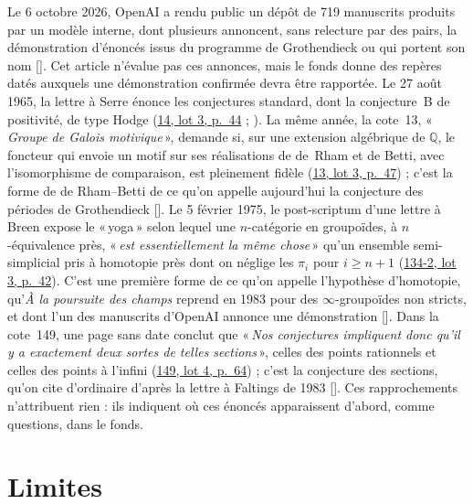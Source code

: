 \documentclass[11pt]{amsart}
\makeatletter
\newcommand{\q}[1]{«\,\textit{#1}\,»}
\newcommand{\mot}[1]{«\,#1\,»}
\def\RHM@first#1--#2\@nil{#1}
\DeclareRobustCommand{\lot}[3]{\begingroup\edef\RHM@pdfpage{\the\numexpr\RHM@first#3--\@nil+1\relax}\href{https://grothendieck.umontpellier.fr/#1.pdf\#page=\RHM@pdfpage}{#1, lot #2, p.~#3}\endgroup}
\newcommand{\lot}[3]{\href{https://grothendieck.commutator.io/\##1/#2/p#3}{#1, lot #2, p.~#3}}
\makeatother
\begin{document}
Le 6 octobre 2026, OpenAI a rendu public un dépôt de 719 manuscrits produits par un modèle interne, dont plusieurs annoncent, sans relecture par des pairs, la démonstration d'énoncés issus du programme de Grothendieck ou qui portent son nom [\citealp{openai2026}]. Cet article n'évalue pas ces annonces, mais le fonds donne des repères datés auxquels une démonstration confirmée devra être rapportée. Le 27 août 1965, la lettre à Serre énonce les conjectures standard, dont la conjecture~B de positivité, de type Hodge (\lot{14}{3}{44} ; \citealp{colmez2001}). La même année, la cote~13, \q{Groupe de Galois motivique}, demande si, sur une extension algébrique de $\mathbb{Q}$, le foncteur qui envoie un motif sur ses réalisations de de~Rham et de Betti, avec l'isomorphisme de comparaison, est pleinement fidèle (\lot{13}{3}{47}) ; c'est la forme de de Rham--Betti de ce qu'on appelle aujourd'hui la conjecture des périodes de Grothendieck [\citealp{bostcharles2016}]. Le 5 février 1975, le post-scriptum d'une lettre à Breen expose le \mot{yoga} selon lequel une $n$-catégorie en groupoïdes, à $n$-équivalence près, \q{est essentiellement la même chose} qu'un ensemble semi-simplicial pris à homotopie près dont on néglige les $\pi_i$ pour $i \geqslant n+1$ (\lot{134-2}{3}{42}). C'est une première forme de ce qu'on appelle l'hypothèse d'homotopie, qu'\emph{À la poursuite des champs} reprend en 1983 pour des $\infty$-groupoïdes non stricts, et dont l'un des manuscrits d'OpenAI annonce une démonstration [\citealp{openai2026hh}]. Dans la cote~149, une page sans date conclut que \q{Nos conjectures impliquent donc qu'il y a exactement deux sortes de telles sections}, celles des points rationnels et celles des points à l'infini (\lot{149}{4}{64}) ; c'est la conjecture des sections, qu'on cite d'ordinaire d'après la lettre à Faltings de 1983 [\citealp{grothendieck1997b}]. Ces rapprochements n'attribuent rien : ils indiquent où ces énoncés apparaissent d'abord, comme questions, dans le fonds.

\section{Limites}\label{sec:limites}
\end{document}
